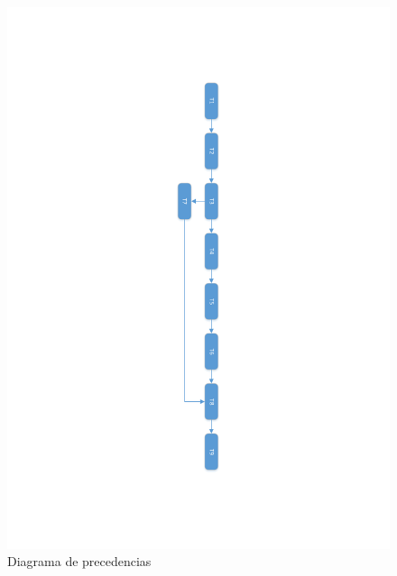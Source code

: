 \begin{figure}[!htbp]
	\centering
	\includegraphics[page=1, scale=.8]{fig/diagrama_precedencias}
	\caption{Diagrama de precedencias}\label{fig:network_diagram}
\end{figure}
